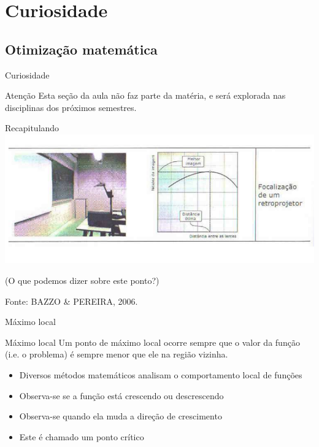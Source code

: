 \documentclass{beamer}
\begin{document}
\section{Curiosidade}
\subsection{Otimização matemática}

\begin{frame}{Curiosidade}
  \begin{block}{Atenção}
    Esta seção da aula não faz parte da matéria, e será explorada nas disciplinas dos próximos semestres.
  \end{block}
\end{frame}

\begin{frame}{Recapitulando}
  \centering
  \includegraphics[width=1.1\textwidth]{otimizacao/1var}

(O que podemos dizer sobre este ponto?)

\vfill
Fonte: BAZZO \& PEREIRA, 2006.
\end{frame}

\begin{frame}{Máximo local}
  \begin{block}{Máximo local}
    Um ponto de máximo local ocorre sempre que o valor da função (i.e. o problema) é sempre menor que ele na região vizinha.
  \end{block}

  \begin{itemize}
  \item<1-> Diversos métodos matemáticos analisam o comportamento local de funções
  \item<1-> Observa-se se a função está crescendo ou descrescendo
  \item Observa-se quando ela \alert{muda} a direção de crescimento
  \item Este é chamado um \alert{ponto crítico}
  \end{itemize}
\end{frame}
\end{document}
